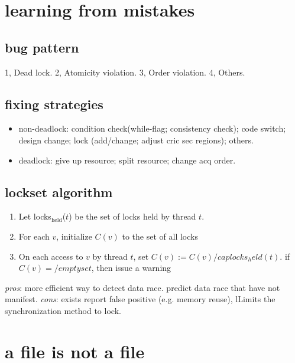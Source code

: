 \documentclass[9pt,conference]{IEEEtran}
\begin{document}
\section{learning from mistakes}
\label{sec-4}
\subsection{bug pattern}
\label{sec-4-1}
1, Dead lock. 2, Atomicity violation. 3, Order violation. 4, Others.
\subsection{fixing strategies}
\label{sec-4-2}
\begin{itemize}
\item non-deadlock: condition check(while-flag; consistency check); code switch; design change; lock (add/change; adjust cric sec regions); others.
\item deadlock: give up resource; split resource; change acq order.
\end{itemize}
\subsection{lockset algorithm}
\label{sec-4-3}
\begin{enumerate}
\item Let locks$_{\text{held}}$($t$) be the set of locks held by thread $t$.
\item For each $v$, initialize $C(v)$ to the set of all locks
\item On each access to $v$ by thread $t$, set $C(v):= C(v) /cap locks_held(t)$. if $C(v)=/emptyset$, then issue a warning
\end{enumerate}
\emph{pros}: more efficient way to detect data race. predict data race that have not manifest.
\emph{cons}: exists report false positive (e.g. memory reuse), lLimits the synchronization method to lock.

\section{a file is not a file}
\label{sec-5}
\end{document}
